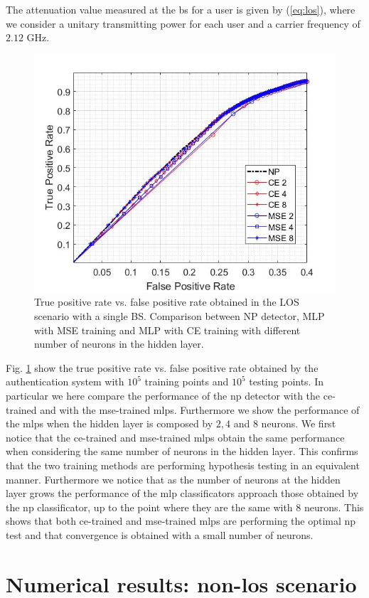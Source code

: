 \documentclass[draftcls,onecolumn,12pt]{IEEEtran}
\begin{document}
The attenuation value measured at the \ac{bs} for a user is given by (\ref{eq:los}), where we consider a unitary transmitting power for each user and a carrier frequency of $2.12$ GHz.
\begin{figure}[h]
    \centering
    \includegraphics[width=0.5\columnwidth]{mseVSce.jpg}
    \caption{True positive rate vs. false positive rate obtained in the LOS scenario with a single BS. Comparison between NP detector, MLP with MSE training and MLP with CE training with different number of neurons in the hidden layer.}
    \label{fig:ceVSmse}
\end{figure}

Fig. \ref{fig:ceVSmse} show the true positive rate vs. false positive rate obtained by the authentication system with $10^5$ training points and $10^5$ testing points. In particular we here compare the performance of the \ac{np} detector with the \ac{ce}-trained and with the \ac{mse}-trained \acp{mlp}. Furthermore we show the performance of the \acp{mlp} when the hidden layer is composed by $2,4 $ and $8$ neurons. We first notice that the \ac{ce}-trained and \ac{mse}-trained \acp{mlp} obtain the same performance when considering the same number of neurons in the hidden layer. This confirms that the two training methods are performing hypothesis testing in an equivalent manner. Furthermore we notice that as the number of neurons at the hidden layer grows the performance of the \ac{mlp} classificators approach those obtained by the \ac{np} classificator, up to the point where they are the same with $8$ neurons. This shows that both \ac{ce}-trained and \ac{mse}-trained \acp{mlp} are performing the optimal \ac{np} test and that convergence is obtained with a small number of neurons.



\section{Numerical results: non-los scenario}\label{sec:res_nLos}
\end{document}
